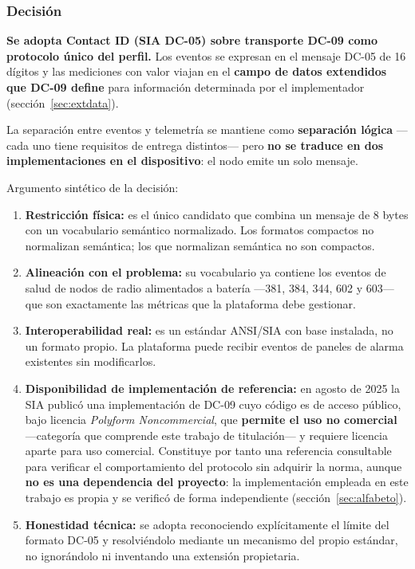 \subsubsection{Decisión}

\begin{cajaclave}[title={Protocolo seleccionado}]
\textbf{Se adopta Contact ID (SIA DC-05) sobre transporte DC-09 como protocolo único del perfil.} Los
eventos se expresan en el mensaje DC-05 de 16 dígitos y las mediciones con valor viajan en el
\textbf{campo de datos extendidos que DC-09 define} para información determinada por el implementador
(sección~\ref{sec:extdata}).

La separación entre eventos y telemetría se mantiene como \textbf{separación lógica} ---cada uno tiene
requisitos de entrega distintos--- pero \textbf{no se traduce en dos implementaciones en el
dispositivo}: el nodo emite un solo mensaje.
\end{cajaclave}

Argumento sintético de la decisión:

\begin{enumerate}
\item \textbf{Restricción física:} es el único candidato que combina un mensaje de 8 bytes con un
vocabulario semántico normalizado. Los formatos compactos no normalizan semántica; los que normalizan
semántica no son compactos.
\item \textbf{Alineación con el problema:} su vocabulario ya contiene los eventos de salud de nodos de
radio alimentados a batería ---381, 384, 344, 602 y 603--- que son exactamente las métricas que la
plataforma debe gestionar.
\item \textbf{Interoperabilidad real:} es un estándar ANSI/SIA con base instalada, no un formato propio.
La plataforma puede recibir eventos de paneles de alarma existentes sin modificarlos.
\item \textbf{Disponibilidad de implementación de referencia:} en agosto de 2025 la SIA publicó una
implementación de DC-09 cuyo código es de acceso público, bajo licencia \emph{Polyform Noncommercial},
que \textbf{permite el uso no comercial} ---categoría que comprende este trabajo de titulación--- y
requiere licencia aparte para uso comercial. Constituye por tanto una referencia consultable para
verificar el comportamiento del protocolo sin adquirir la norma, aunque \textbf{no es una dependencia
del proyecto}: la implementación empleada en este trabajo es propia y se verificó de forma
independiente (sección~\ref{sec:alfabeto}).
\item \textbf{Honestidad técnica:} se adopta reconociendo explícitamente el límite del formato DC-05 y
resolviéndolo mediante un mecanismo del propio estándar, no ignorándolo ni inventando una extensión
propietaria.
\end{enumerate}


